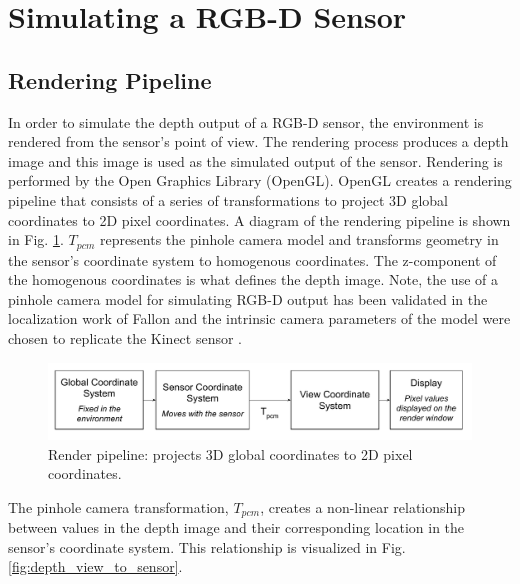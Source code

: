 \section{Simulating a RGB-D Sensor}

\subsection{Rendering Pipeline}

In order to simulate the depth output of a RGB-D sensor, the environment is
rendered from the sensor's point of view. The rendering process produces a depth
image and this image is used as the simulated output of the sensor. Rendering is
performed by the Open Graphics Library (OpenGL). OpenGL creates a rendering
pipeline that consists of a series of transformations to project 3D global
coordinates to 2D pixel coordinates. A diagram of the rendering pipeline is
shown in Fig. \ref{fig:render_pipeline}. $T_{pcm}$ represents the pinhole
camera model and transforms geometry in the sensor's coordinate system to
homogenous coordinates. The z-component of the homogenous coordinates is what
defines the depth image. Note, the use of a pinhole camera model for simulating
RGB-D output has been validated in the localization work of Fallon
\cite{Fallon2012} and the intrinsic camera parameters of the model were chosen
to replicate the Kinect sensor \cite{sitekinectspecs}.

\begin{figure}[h]%
\centering
  \includegraphics[width=\textwidth]{figures/expsetup_render_pipeline.pdf}
  \caption{Render pipeline: projects 3D global coordinates to 2D pixel coordinates. }
  \label{fig:render_pipeline}
\end{figure}

The pinhole camera transformation, $T_{pcm}$, creates a non-linear relationship
between values in the depth image and their corresponding location in the
sensor's coordinate system. This relationship is visualized in Fig.
\ref{fig:depth_view_to_sensor}.


